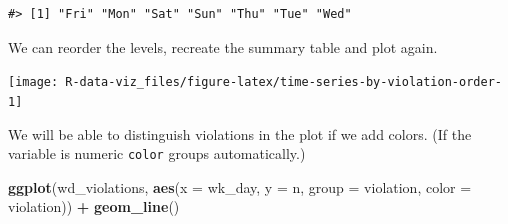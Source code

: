 \documentclass[]{book}
\newenvironment{Shaded}{\begin{snugshade}}{\end{snugshade}}
\newcommand{\KeywordTok}[1]{\textcolor[rgb]{0.13,0.29,0.53}{\textbf{#1}}}
\newcommand{\DataTypeTok}[1]{\textcolor[rgb]{0.13,0.29,0.53}{#1}}
\newcommand{\StringTok}[1]{\textcolor[rgb]{0.31,0.60,0.02}{#1}}
\newcommand{\OperatorTok}[1]{\textcolor[rgb]{0.81,0.36,0.00}{\textbf{#1}}}
\newcommand{\NormalTok}[1]{#1}
\theoremstyle{definition}
\theoremstyle{definition}
\theoremstyle{definition}
\theoremstyle{remark}
\begin{document}
\begin{Shaded}
\end{Shaded}

\begin{verbatim}
#> [1] "Fri" "Mon" "Sat" "Sun" "Thu" "Tue" "Wed"
\end{verbatim}

We can reorder the levels, recreate the summary table and plot again.

\begin{Shaded}
\end{Shaded}

\texttt{[image: R-data-viz\_files/figure-latex/time-series-by-violation-order-1]}

We will be able to distinguish violations in the plot if we add colors.
(If the variable is numeric \texttt{color} groups automatically.)

\begin{Shaded}
\begin{Highlighting}[]
\KeywordTok{ggplot}\NormalTok{(wd_violations, }\KeywordTok{aes}\NormalTok{(}\DataTypeTok{x =}\NormalTok{ wk_day, }\DataTypeTok{y =}\NormalTok{ n, }\DataTypeTok{group =}\NormalTok{ violation, }\DataTypeTok{color =}\NormalTok{ violation)) }\OperatorTok{+}
\StringTok{  }\KeywordTok{geom_line}\NormalTok{()}
\end{Highlighting}
\end{Shaded}
\end{document}

